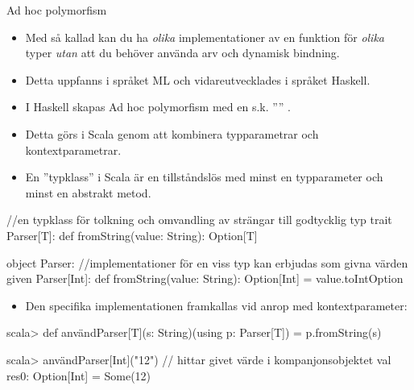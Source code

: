 \begin{Slide}{Ad hoc polymorfism}\SlideFontTiny
\begin{itemize}\SlideFontTiny
\item Med så kallad  kan du ha \emph{olika} implementationer av en funktion för \emph{olika} typer \emph{utan} att du behöver använda arv och dynamisk bindning. 
\item Detta uppfanns i språket ML och vidareutvecklades i språket Haskell.
\item I Haskell skapas Ad hoc polymorfism med en s.k. '''' . %
\item Detta görs i Scala genom att kombinera typparametrar och kontextparametrar.
\item En ''typklass'' i Scala är en tillståndslös  med minst en typparameter och minst en abstrakt metod.
\end{itemize}
\begin{CodeSmall}
//en typklass för tolkning och omvandling av strängar till godtycklig typ 
trait Parser[T]: 
  def fromString(value: String): Option[T]

object Parser: //implementationer för en viss typ kan erbjudas som givna värden
  given Parser[Int]: 
    def fromString(value: String): Option[Int] = value.toIntOption   
\end{CodeSmall}
\begin{itemize}\SlideFontTiny
\item Den specifika implementationen framkallas vid anrop med kontextparameter:
\end{itemize}
\begin{REPLsmall}
scala> def användParser[T](s: String)(using p: Parser[T]) = p.fromString(s)

scala> användParser[Int]("12")        // hittar givet värde i kompanjonsobjektet
val res0: Option[Int] = Some(12)
\end{REPLsmall}
\end{Slide}

